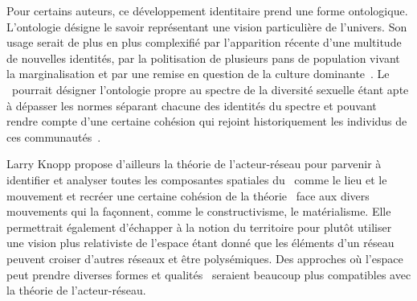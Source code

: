 Pour certains auteurs, ce développement identitaire prend une forme ontologique.
L'ontologie désigne le savoir représentant une vision particulière de l'univers. 
Son usage serait de plus en plus complexifié par l'apparition récente d'une multitude de nouvelles identités, par la politisation de plusieurs pans de population vivant la marginalisation et par une remise en question de la culture dominante~\citep[122]{Knopp2004}. 
Le \qu\ pourrait désigner l'ontologie propre au spectre de la diversité sexuelle étant apte à dépasser les normes séparant chacune des identités du spectre \lgbt{} et pouvant rendre compte d'une certaine cohésion qui rejoint historiquement les individus de ces communautés~\citep[122]{Knopp2004}.

Larry Knopp propose d'ailleurs la théorie de l'acteur-réseau pour parvenir à identifier et analyser toutes les composantes spatiales du \qu\ comme le lieu et le mouvement et recréer une certaine cohésion de la théorie \qu\ face aux divers mouvements qui la façonnent, comme le constructivisme, le matérialisme. 
Elle permettrait également d'échapper à la notion du territoire pour plutôt utiliser une vision plus relativiste de l'espace étant donné que les éléments d'un réseau peuvent croiser d'autres réseaux et être polysémiques. 
Des approches où l'espace peut prendre diverses formes et qualités~\citep{DiMeo1998} seraient beaucoup plus compatibles avec la théorie de l'acteur-réseau.


